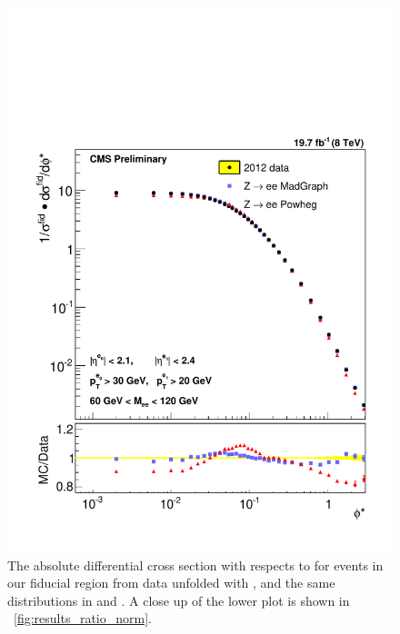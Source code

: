 \begin{figure}[!p]
    \centering
    \includegraphics[width=\textwidth]{figures/ZShape_elec_Norm_Dressed.pdf}
    \caption[
        The absolute differential cross section with respects to \phistar for
        \Ztoee events in our fiducial region from data unfolded with \MADGRAPH,
        and the same distributions in \MADGRAPH and \POWHEG.
    ]{
        The absolute differential cross section with respects to \phistar for
        \Ztoee events in our fiducial region from data unfolded with \MADGRAPH,
        and the same distributions in \MADGRAPH and \POWHEG. A close up of the
        lower plot is shown in \FIG~\ref{fig:results_ratio_norm}.
    }
    \label{fig:results_norm}
\end{figure}

